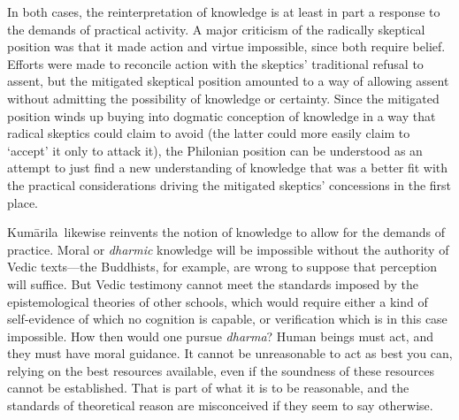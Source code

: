 \documentclass[11pt,letterpaper,oneside]{amsart}
\newcommand{\kum}{Kum\={a}rila}
\begin{document}
In both cases, the reinterpretation of knowledge is at least in part a response to the demands of practical activity. A major criticism of the radically skeptical position was that it made action and virtue impossible, since both require belief. Efforts were made to reconcile action with the skeptics' traditional refusal to assent, but the mitigated skeptical position amounted to a way of allowing assent without admitting the possibility of knowledge or certainty. Since the mitigated position winds up buying into dogmatic conception of knowledge in a way that radical skeptics could claim to avoid (the latter could more easily claim to `accept' it only to attack it), the Philonian position can be understood as an attempt to just find a new understanding of knowledge that was a better fit with the practical considerations driving the mitigated skeptics' concessions in the first place.

\kum\ likewise reinvents the notion of knowledge to allow for the demands of practice. Moral or \emph{dharmic} knowledge will be impossible without the authority of Vedic texts---the Buddhists, for example, are wrong to suppose that perception will suffice. But Vedic testimony cannot meet the standards imposed by the epistemological theories of other schools, which would require either a kind of self-evidence of which no cognition is capable, or verification which is in this case impossible. How then would one pursue \emph{dharma}? Human beings must act, and they must have moral guidance. It cannot be unreasonable to act as best you can, relying on the best resources available, even if the soundness of these resources cannot be established. That is part of what it is to be reasonable, and the standards of theoretical reason are misconceived if they seem to say otherwise.















%

%



\nocite{jha1937tattvasangraha}
\nocite{sepkumarila}


{}


%
\end{document}
